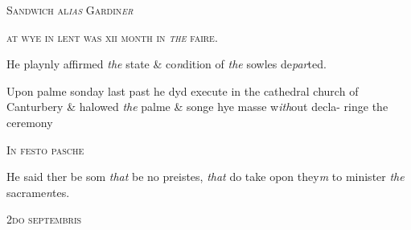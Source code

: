 \documentclass[12pt, a4paper]{book}
\begin{document}
            
            
            	
				\begin{center} \begin{large} {\scshape Sandwich al\textit{ias} Gardin\textit{er}
               } \end{large} \end{center}
			
               
                  
				\begin{center}  {\scshape  at wye in lent was
 xii month in \textit{the} faire.}  \end{center}
			


				\marginpar[\vspace{0.5cm}{\textcolor{Gray}{n+}}]{}
			
		\ifthenelse{\isodd{\thepage}}
		{\reversemarginpar}
		{\normalmarginpar}
		He playnly affirmed \textit{the} state \& co\textit{n}dition of \textit{the} sowles de\textit{par}ted.
 
				\marginpar[\vspace{0.5cm}{\textcolor{Gray}{ceremonies n}}]{}
			
		\ifthenelse{\isodd{\thepage}}
		{\reversemarginpar}
		{\normalmarginpar}
		Upon palme sonday last past
			 he dyd execute in the cathedral church of
 	Canturbery \& halowed \textit{the} palme \& songe hye masse w\textit{ith}out decla-
 ringe the ceremony
 

               
                  
				\begin{center}  {\scshape In festo pasche}  \end{center}
			

 
				\marginpar[\vspace{0.5cm}{\textcolor{Gray}{n}}]{}
			
		\ifthenelse{\isodd{\thepage}}
		{\reversemarginpar}
		{\normalmarginpar}
		He said ther be som \textit{that} be no preistes, \textit{that} do take opon they\textit{m} to
 minister \textit{the} sacrame\textit{n}tes.
 

               
                  
				\begin{center}  {\scshape 
                     2do septembris
                  }  \end{center}
			
\end{document}
